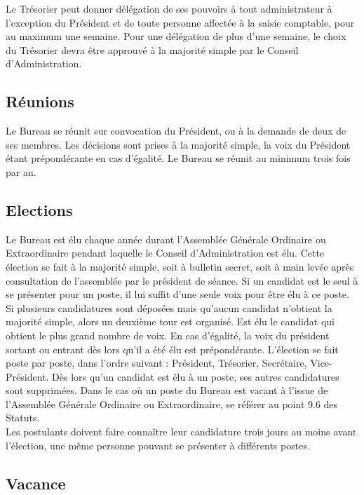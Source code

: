 \documentclass[12pt]{article}
\begin{document}
Le Trésorier peut donner délégation de ses pouvoirs à tout administrateur à l’exception du Président et de
toute personne affectée à la saisie comptable, pour au maximum une semaine. Pour une délégation de plus
d’une semaine, le choix du Trésorier devra être approuvé à la majorité simple par le Conseil d’Administration.

\subsection{Réunions}
\label{sec:bureau:reunions}

Le Bureau se réunit sur convocation du Président, ou à la demande de deux de ses membres. Les décisions
sont prises à la majorité simple, la voix du Président étant prépondérante en cas d’égalité.
Le Bureau se réunit au minimum trois fois par an.


\subsection{Elections}
\label{sec:bureau:elections}

Le Bureau est élu chaque année durant l’Assemblée Générale Ordinaire ou Extraordinaire pendant laquelle
le Conseil d’Administration est élu. Cette élection se fait à la majorité simple, soit à bulletin secret, soit à
main levée après consultation de l’assemblée par le président de séance.
Si un candidat est le seul à se présenter pour un poste, il lui suffit d’une seule voix pour être élu à ce poste. Si
plusieurs candidatures sont déposées mais qu’aucun candidat n’obtient la majorité simple, alors un
deuxième tour est organisé. Est élu le candidat qui obtient le plus grand nombre de voix. En cas d’égalité, la
voix du président sortant ou entrant dès lors qu’il a été élu est prépondérante.
L’élection se fait poste par poste, dans l’ordre suivant : Président, Trésorier, Secrétaire, Vice-Président. Dès
lors qu’un candidat est élu à un poste, ses autres candidatures sont supprimées. Dans le cas où un poste du
Bureau est vacant à l’issue de l’Assemblée Générale Ordinaire ou Extraordinaire, se référer au point 9.6 des
Statuts.\\
Les postulants doivent faire connaître leur candidature trois jours au moins avant l’élection, une même
personne pouvant se présenter à différents postes.


\subsection{Vacance}
\label{sec:bureau:vacance}
\end{document}
